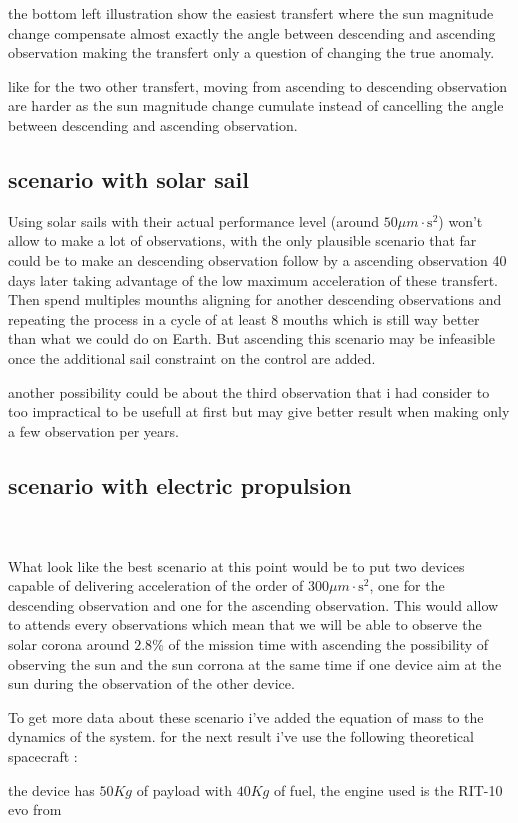 \documentclass{article} %
\begin{document}
			the bottom left illustration show the easiest transfert where the sun magnitude change compensate almost exactly the angle between descending and ascending observation making the transfert only a question of changing the true anomaly.
			
			like for the two other transfert, moving from ascending to descending observation are harder as the sun magnitude change cumulate instead of cancelling the angle between descending and ascending observation. 
			
			
			
			\subsection{scenario with solar sail}
			
			Using solar sails with their actual performance level (around $50\mu{m}\cdot\text{s}^2$) won't allow to make a lot of observations, with the only plausible scenario that far could be to make an descending observation follow by a ascending observation 40 days later taking advantage of the low maximum acceleration of these transfert. Then spend multiples mounths aligning for another descending observations and repeating the process in a cycle of at least 8 mouths which is still way better than what we could do on Earth. But ascending this scenario may be infeasible once the additional sail constraint on the control are added.
			
			another possibility could be about the third observation that i had consider to too impractical to be usefull at first but may give better result when making only a few observation per years.
			
			\subsection{scenario with electric propulsion}	
			\\ \\
			What look like the best scenario at this point would be to put two devices capable of delivering acceleration of the order of $300\mu{m}\cdot\text{s}^2$, one for the descending observation and one for the ascending observation. This would allow to attends every observations which mean that we will be able to observe the solar corona around $2.8\%$ of the mission time with ascending the possibility of observing the sun and the sun corrona at the same time if one device aim at the sun during the observation of the other device.
			
			To get more data about these scenario i've added the equation of mass to the dynamics of the system. for the next result i've use the following theoretical spacecraft : 
			
			the device has $50Kg$ of payload with $40Kg$ of fuel, the engine used is the RIT-10 evo from 
			 
	
		
\end{document}
